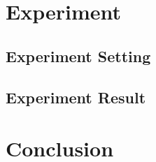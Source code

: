 \documentclass[conference]{IEEEtran}
\begin{document}
\section{Experiment}
\subsection{Experiment Setting}
\subsection{Experiment Result}
\section{Conclusion}






%

  

\end{document}
